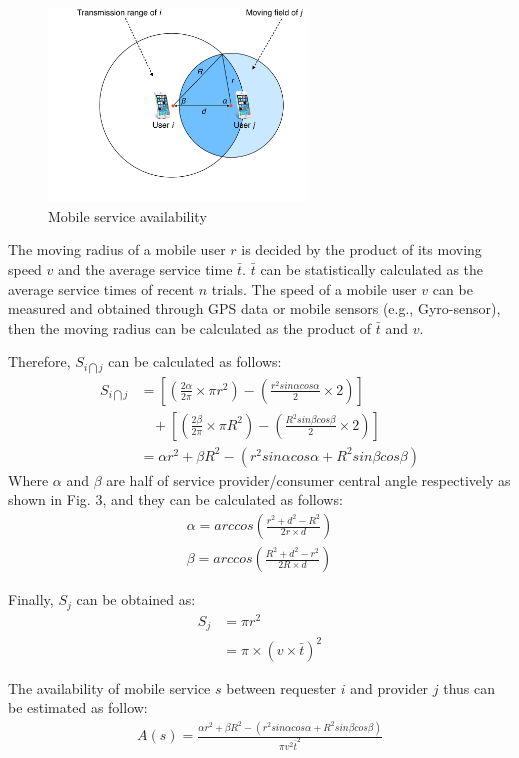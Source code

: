 \documentclass[journal]{IEEEtran}
\begin{document}
\begin{figure}[!t]
\centering
\includegraphics[width=2.7in]{./img/pic3.pdf}
\caption{Mobile service availability}
\label{fig_sd}
\end{figure}

The moving radius of a mobile user $r$ is decided by the product of its moving speed $v$ and the average service time $\bar{t}$. $\bar{t}$ can be statistically calculated as the average service times of recent $n$ trials.
The speed of a mobile user $v$ can be measured and obtained through GPS data or mobile sensors (e.g., Gyro-sensor), then the moving radius can be calculated as the product of $\bar{t}$ and $v$.

Therefore, $S_{i \bigcap j}$ can be calculated as follows:
\setlength{\arraycolsep}{0.0em}
\begin{align}
S_{i \bigcap j} & =  [(\frac{2\alpha}{2\pi} \times \pi r^2)-(\frac{r^2 sin\alpha cos\alpha}{2} \times 2)]\\\nonumber
& \ \ \ \ +[(\frac{2\beta}{2\pi} \times \pi R^2)-(\frac{R^2 sin\beta cos\beta}{2} \times 2)]\\\nonumber
& = \alpha r^2 + \beta R^2 - (r^2 sin\alpha cos\alpha + R^2 sin\beta cos\beta)
\end{align}
\setlength{\arraycolsep}{5pt}
Where $\alpha$ and $\beta$ are half of service provider/consumer central angle respectively as shown in Fig. 3, and they can be calculated as follows:
\begin{eqnarray}
\alpha = arccos(\frac{r^2+d^2-R^2}{2r\times d}) \\\nonumber
\beta = arccos(\frac{R^2+d^2-r^2}{2R\times d})
\end{eqnarray}

Finally, $S_j$ can be obtained as:
\begin{align}
S_j & = \pi r^2 \\\nonumber
& = \pi \times (v \times \bar{t})^2
\end{align}

The availability of mobile service $s$ between requester $i$ and provider $j$ thus can be estimated as follow:
\begin{align}
A(s) = \frac{\alpha r^2 + \beta R^2 - (r^2 sin\alpha cos\alpha + R^2 sin\beta cos\beta)}{\pi v^2 \bar{t}^2}
\end{align}
\end{document}
